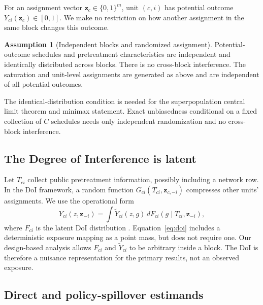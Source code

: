 \documentclass[10pt]{article}
\theoremstyle{definition}
\newtheorem{assumption}[theorem]{Assumption}
\theoremstyle{remark}
\begin{document}
For an assignment vector $\mathbf z_c\in\{0,1\}^m$, unit $(c,i)$ has potential outcome
$Y_{ci}(\mathbf z_c)\in[0,1]$. We make no restriction on how another assignment in the same
block changes this outcome.

\begin{assumption}[Independent blocks and randomized assignment]
\label{ass:block}
Potential-outcome schedules and pretreatment characteristics are independent and identically
distributed across blocks. There is no cross-block interference. The saturation and unit-level
assignments are generated as above and are independent of all potential outcomes.
\end{assumption}

The identical-distribution condition is needed for the superpopulation central limit theorem
and minimax statement. Exact unbiasedness conditional on a fixed collection of $C$ schedules
needs only independent randomization and no cross-block interference.

\subsection{The Degree of Interference is latent}

Let $T_{ci}$ collect public pretreatment information, possibly including a network row. In the
DoI framework, a random function $G_{ci}(T_{ci},\mathbf z_{c,-i})$ compresses other units'
assignments. We use the operational form
\begin{equation}
  Y_{ci}(z,\mathbf z_{-i})
  = \int \widetilde Y_{ci}(z,g)\,
      dF_{ci}(g\mid T_{ci},\mathbf z_{-i}),
  \label{eq:doi}
\end{equation}
where $F_{ci}$ is the latent DoI distribution
\citep{OhnishiKarmakarSabbaghi2025}. Equation~\eqref{eq:doi} includes a deterministic exposure
mapping as a point mass, but does not require one. Our design-based analysis allows
$F_{ci}$ and $\widetilde Y_{ci}$ to be arbitrary inside a block. The DoI is therefore a nuisance
representation for the primary results, not an observed exposure.

\subsection{Direct and policy-spillover estimands}
\end{document}
